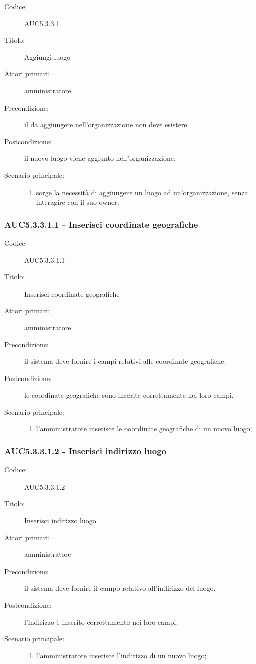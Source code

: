 \documentclass[../../../analisi-dei-requisiti.tex]{subfiles}
\begin{document}
\begin{description}
  \item[Codice:] AUC5.3.3.1
  \item[Titolo:] Aggiungi luogo
  \item[Attori primari:] amministratore
  \item[Precondizione:] il  da aggiungere nell'organizzazione non deve esistere.
  \item[Postcondizione:] il nuovo luogo viene aggiunto nell'organizzazione.
  \item[Scenario principale:]
  \begin{enumerate}
    \item sorge la necessità di aggiungere un luogo ad un'organizzazione, senza interagire con il suo owner;
  \end{enumerate}
\end{description}

\subsubsection{AUC5.3.3.1.1 - Inserisci coordinate geografiche}%
\label{subsub:AUC5.3.3.1.1}
\begin{description}
  \item[Codice:] AUC5.3.3.1.1
  \item[Titolo:] Inserisci coordinate geografiche
  \item[Attori primari:] amministratore
  \item[Precondizione:] il sistema deve fornire i campi relativi alle coordinate geografiche.
  \item[Postcondizione:] le coordinate geografiche sono inserite correttamente nei loro campi.
  \item[Scenario principale:]
  \begin{enumerate}
    \item l'amministratore inserisce le coordinate geografiche di un nuovo luogo;
  \end{enumerate}
\end{description}

\subsubsection{AUC5.3.3.1.2 - Inserisci indirizzo luogo}%
\label{subsub:AUC5.3.3.1.2}
\begin{description}
  \item[Codice:] AUC5.3.3.1.2
  \item[Titolo:] Inserisci indirizzo luogo
  \item[Attori primari:] amministratore
  \item[Precondizione:] il sistema deve fornire il campo relativo all'indirizzo del luogo.
  \item[Postcondizione:] l'indirizzo è inserito correttamente nei loro campi.
  \item[Scenario principale:]
  \begin{enumerate}
    \item l'amministratore inserisce l'indirizzo di un nuovo luogo;
  \end{enumerate}
\end{description}
\end{document}
